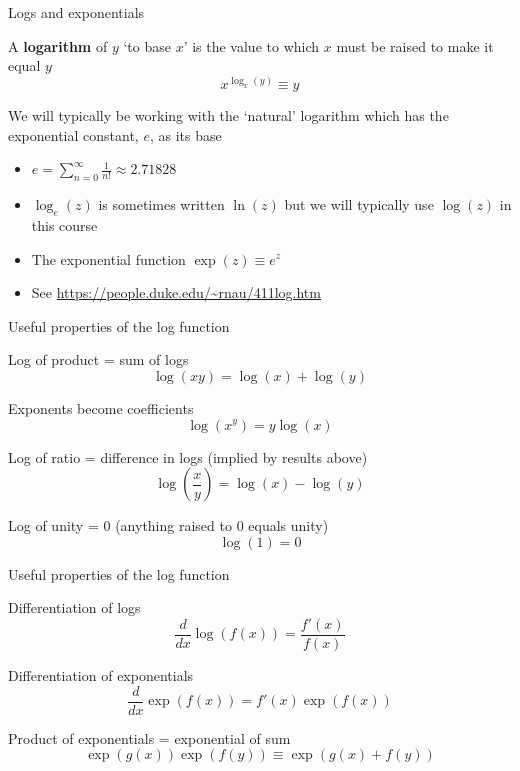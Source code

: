 

\begin{frame}{Logs and exponentials}

A \textbf{logarithm} of $y$ `to base $x$' is the value to which $x$ must be raised to make it equal $y$
\[
x^{\log_{x}{(y)}} \equiv y
\]

We will typically be working with the `natural' logarithm which has the exponential constant, $e$, as its base
\begin{itemize}
\item	$e = \sum\limits_{n=0}^{\infty} \frac{1}{n!} \approx 2.71828$
\item	$\log_{e}{(z)}$ is sometimes written $\ln{(z)}$ but we will typically use $\log{(z)}$ in this course
\item	The exponential function $\exp{(z)} \equiv e^{z}$
\item	See \url{https://people.duke.edu/~rnau/411log.htm}
\end{itemize}

\end{frame}



\begin{frame}{Useful properties of the log function}

Log of product = sum of logs
\[
\log{(xy)} = \log{(x)} + \log{(y)}
\]

Exponents become coefficients
\[
\log{(x^{y})} = y\log{(x)}
\]

Log of ratio = difference in logs (implied by results above)
\[
\log{\left(\frac{x}{y}\right)} = \log{(x)} - \log{(y)}
\]

Log of unity = $0$ (anything raised to $0$ equals unity)
\[
\log{(1)} = 0
\]

\end{frame}



\begin{frame}{Useful properties of the log function}

Differentiation of logs
\[
\frac{d}{dx} \log{(f(x))} = \frac{f'(x)}{f(x)}
\]

Differentiation of exponentials
\[
\frac{d}{dx} \exp{(f(x))} = f'(x)\exp{(f(x))}
\]

Product of exponentials = exponential of sum
\[
\exp{(g(x))} \exp{(f(y))} \equiv \exp{(g(x) + f(y))}
\]

\end{frame}

